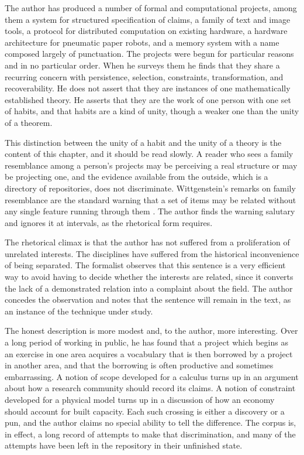 \documentclass[11pt,openany,twoside]{book}
\theoremstyle{plain}
\theoremstyle{definition}
\theoremstyle{remark}
\begin{document}
The author has produced a number of formal and computational projects, among them a system for structured specification of claims, a family of text and image tools, a protocol for distributed computation on existing hardware, a hardware architecture for pneumatic paper robots, and a memory system with a name composed largely of punctuation. The projects were begun for particular reasons and in no particular order. When he surveys them he finds that they share a recurring concern with persistence, selection, constraints, transformation, and recoverability. He does not assert that they are instances of one mathematically established theory. He asserts that they are the work of one person with one set of habits, and that habits are a kind of unity, though a weaker one than the unity of a theorem.

This distinction between the unity of a habit and the unity of a theory is the content of this chapter, and it should be read slowly. A reader who sees a family resemblance among a person's projects may be perceiving a real structure or may be projecting one, and the evidence available from the outside, which is a directory of repositories, does not discriminate. Wittgenstein's remarks on family resemblance are the standard warning that a set of items may be related without any single feature running through them \cite{wittgenstein-investigations}. The author finds the warning salutary and ignores it at intervals, as the rhetorical form requires.

The rhetorical climax is that the author has not suffered from a proliferation of unrelated interests. The disciplines have suffered from the historical inconvenience of being separated. The formalist observes that this sentence is a very efficient way to avoid having to decide whether the interests are related, since it converts the lack of a demonstrated relation into a complaint about the field. The author concedes the observation and notes that the sentence will remain in the text, as an instance of the technique under study.

The honest description is more modest and, to the author, more interesting. Over a long period of working in public, he has found that a project which begins as an exercise in one area acquires a vocabulary that is then borrowed by a project in another area, and that the borrowing is often productive and sometimes embarrassing. A notion of scope developed for a calculus turns up in an argument about how a research community should record its claims. A notion of constraint developed for a physical model turns up in a discussion of how an economy should account for built capacity. Each such crossing is either a discovery or a pun, and the author claims no special ability to tell the difference. The corpus is, in effect, a long record of attempts to make that discrimination, and many of the attempts have been left in the repository in their unfinished state.
\end{document}
